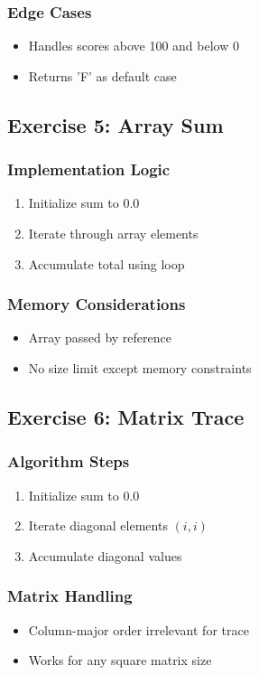 \documentclass{book}
\begin{document}
\subsubsection*{Edge Cases}
\begin{itemize}
\item Handles scores above 100 and below 0
\item Returns 'F' as default case
\end{itemize}

\subsection*{Exercise 5: Array Sum}
\subsubsection*{Implementation Logic}
\begin{enumerate}
\item Initialize sum to 0.0
\item Iterate through array elements
\item Accumulate total using loop
\end{enumerate}

\subsubsection*{Memory Considerations}
\begin{itemize}
\item Array passed by reference
\item No size limit except memory constraints
\end{itemize}

\subsection*{Exercise 6: Matrix Trace}
\subsubsection*{Algorithm Steps}
\begin{enumerate}
\item Initialize sum to 0.0
\item Iterate diagonal elements \( (i,i) \)
\item Accumulate diagonal values
\end{enumerate}

\subsubsection*{Matrix Handling}
\begin{itemize}
\item Column-major order irrelevant for trace
\item Works for any square matrix size
\end{itemize}
\end{document}

